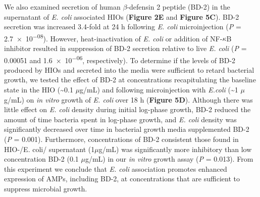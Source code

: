 \documentclass[9pt,lineo]{elife}
\begin{document}
We also examined secretion of human \(\beta\)-defensin 2 peptide (BD-2) in the supernatant of \emph{E. coli} associated HIOs (\textbf{Figure 2E} and \textbf{Figure 5C}). BD-2 secretion was increased 3.4-fold at 24 h following \emph{E. coli} microinjection (\emph{P} = \num{2.7e-08}). 
However, heat-inactivation of \emph{E. coli} or addition of NF-\(\kappa\)B inhibitor resulted in suppression of BD-2 secretion relative to live \emph{E. coli} (\emph{P} = \num{0.00051} and \num{1.6e-06}, respectively). To determine if the levels of BD-2 produced by HIOs and secreted into the media were sufficient to retard bacterial growth, we tested the effect of BD-2 at concentrations recapitulating the baseline state in the HIO (\textasciitilde{}0.1 \(\mu\)g/mL) and following microinjection with \emph{E.coli} (\textasciitilde{}1 \(\mu\)g/mL) on \emph{in vitro} growth of \emph{E. coli} over 18 h (\textbf{Figure 5D}). Although there was little effect on \emph{E. coli} density during initial log-phase growth, BD-2 reduced the amount of time bacteria spent in log-phase growth, and \emph{E. coli} density was significantly decreased over time in bacterial growth media supplemented BD-2 (\emph{P} = \num{0.001}). Furthermore, concentrations of BD-2 consistent those found in HIO-/E. coli/ supernatant (1\(\mu\)g/mL) was significantly more inhibitory than low concentration BD-2 (0.1 \(\mu\)g/mL) in our \emph{in vitro} growth assay (\emph{P} = 0.013). From this experiment we conclude that \emph{E. coli} association promotes enhanced expression of AMPs, including BD-2, at concentrations that are sufficient to suppress microbial growth.
\end{document}
